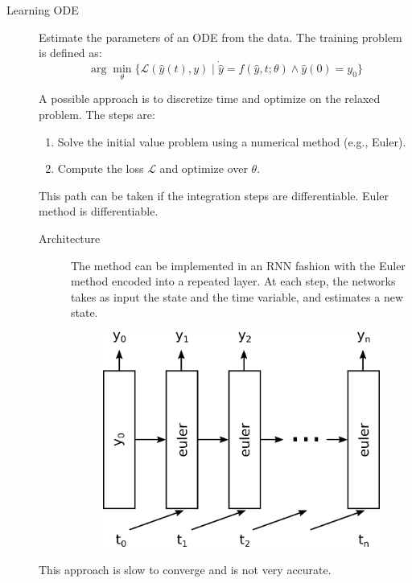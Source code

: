 \begin{description}
    \item[Learning ODE] 
        Estimate the parameters of an ODE from the data. The training problem is defined as:
        \[ \arg\min_\theta \{ \mathcal{L}(\hat{y}(t), y) \mid \dot{\hat{y}} = f(\hat{y}, t; \theta) \land \hat{y}(0) = y_0 \} \]

        A possible approach is to discretize time and optimize on the relaxed problem. The steps are:
        \begin{enumerate}
            \item Solve the initial value problem using a numerical method (e.g., Euler).
            \item Compute the loss $\mathcal{L}$ and optimize over $\theta$.
        \end{enumerate}

        \begin{remark}
            This path can be taken if the integration steps are differentiable. Euler method is differentiable.
        \end{remark}

        \begin{description}
            \item[Architecture]
                The method can be implemented in an RNN fashion with the Euler method encoded into a repeated layer. At each step, the networks takes as input the state and the time variable, and estimates a new state.

                \begin{figure}[H]
                    \centering
                    \includegraphics[width=0.3\linewidth]{./img/rc_ode_learning.png}
                \end{figure}
        \end{description}

        \begin{remark}
            This approach is slow to converge and is not very accurate.
        \end{remark}


\end{description}
